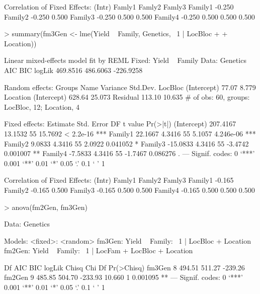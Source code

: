 \documentclass[12pt]{article}
\begin{document}
\begin{Schunk}
\begin{Soutput}
Correlation of Fixed Effects:
        (Intr) Famly1 Famly2 Famly3
Family1 -0.250                     
Family2 -0.250  0.500              
Family3 -0.250  0.500  0.500       
Family4 -0.250  0.500  0.500  0.500
\end{Soutput}
\begin{Sinput}
> summary(fm3Gen <- lme(Yield ~ Family, Genetics, ~1 | LocBloc + 
+     Location))
\end{Sinput}
\begin{Soutput}
Linear mixed-effects model fit by REML
Fixed: Yield ~ Family 
 Data: Genetics 
      AIC      BIC    logLik
 469.8516 486.6063 -226.9258

Random effects:
 Groups   Name        Variance Std.Dev.
 LocBloc  (Intercept)  77.07    8.779  
 Location (Intercept) 628.64   25.073  
 Residual             113.10   10.635  
# of obs: 60, groups: LocBloc, 12; Location, 4

Fixed effects:
            Estimate Std. Error DF t value  Pr(>|t|)    
(Intercept) 207.4167    13.1532 55 15.7692 < 2.2e-16 ***
Family1      22.1667     4.3416 55  5.1057 4.246e-06 ***
Family2       9.0833     4.3416 55  2.0922  0.041052 *  
Family3     -15.0833     4.3416 55 -3.4742  0.001007 ** 
Family4      -7.5833     4.3416 55 -1.7467  0.086276 .  
---
Signif. codes:  0 `***' 0.001 `**' 0.01 `*' 0.05 `.' 0.1 ` ' 1 

Correlation of Fixed Effects:
        (Intr) Famly1 Famly2 Famly3
Family1 -0.165                     
Family2 -0.165  0.500              
Family3 -0.165  0.500  0.500       
Family4 -0.165  0.500  0.500  0.500
\end{Soutput}
\begin{Sinput}
> anova(fm2Gen, fm3Gen)
\end{Sinput}
\begin{Soutput}
Data: Genetics

Models: <fixed>: <random>
fm3Gen: Yield ~ Family: ~1 | LocBloc + Location
fm2Gen: Yield ~ Family: ~1 | LocFam + LocBloc + Location

       Df     AIC     BIC  logLik  Chisq Chi Df Pr(>Chisq)   
fm3Gen  8  494.51  511.27 -239.26                            
fm2Gen  9  485.85  504.70 -233.93 10.660      1   0.001095 **
---
Signif. codes:  0 `***' 0.001 `**' 0.01 `*' 0.05 `.' 0.1 ` ' 1 
\end{Soutput}
\end{Schunk}
\end{document}

